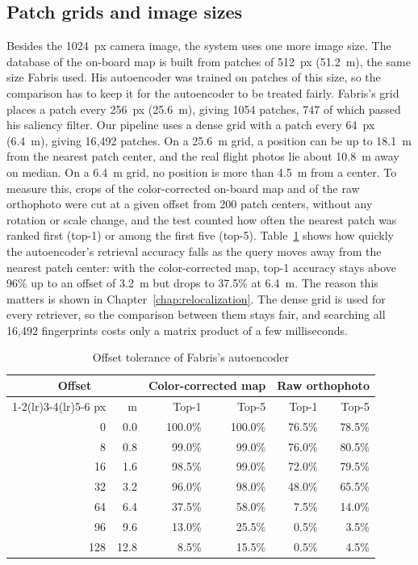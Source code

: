 \documentclass[english, Lau, oneside]{sapthesis}%
\begin{document}
\subsection{Patch grids and image sizes}
\label{sec:patch-grids}
Besides the 1024~px camera image, the system uses one more image size. The database of the on-board map is built from patches of 512~px (51.2~m), the same size Fabris used. His autoencoder was trained on patches of this size, so the comparison has to keep it for the autoencoder to be treated fairly. Fabris's grid places a patch every 256~px (25.6~m), giving 1054 patches, 747 of which passed his saliency filter. Our pipeline uses a dense grid with a patch every 64~px (6.4~m), giving 16{,}492 patches. On a 25.6~m grid, a position can be up to 18.1~m from the nearest patch center, and the real flight photos lie about 10.8~m away on median. On a 6.4~m grid, no position is more than 4.5~m from a center. To measure this, crops of the color-corrected on-board map and of the raw orthophoto were cut at a given offset from 200 patch centers, without any rotation or scale change, and the test counted how often the nearest patch was ranked first (top-1) or among the first five (top-5). Table~\ref{tab:offset-retrieval} shows how quickly the autoencoder's retrieval accuracy falls as the query moves away from the nearest patch center: with the color-corrected map, top-1 accuracy stays above 96\% up to an offset of 3.2~m but drops to 37.5\% at 6.4~m. The reason this matters is shown in Chapter~\ref{chap:relocalization}. The dense grid is used for every retriever, so the comparison between them stays fair, and searching all 16{,}492 fingerprints costs only a matrix product of a few milliseconds.

\begin{table}[!htbp]
  \centering
  \caption{Offset tolerance of Fabris's autoencoder}
  \label{tab:offset-retrieval}
  \begin{tabular}{rrrrrr}
    \toprule
    \multicolumn{2}{c}{Offset} & \multicolumn{2}{c}{Color-corrected map} & \multicolumn{2}{c}{Raw orthophoto} \\
    \cmidrule(lr){1-2}\cmidrule(lr){3-4}\cmidrule(lr){5-6}
    px & m & Top-1 & Top-5 & Top-1 & Top-5 \\
    \midrule
      0 &  0.0 & 100.0\% & 100.0\% & 76.5\% & 78.5\% \\
      8 &  0.8 &  99.0\% &  99.0\% & 76.0\% & 80.5\% \\
     16 &  1.6 &  98.5\% &  99.0\% & 72.0\% & 79.5\% \\
     32 &  3.2 &  96.0\% &  98.0\% & 48.0\% & 65.5\% \\
     64 &  6.4 &  37.5\% &  58.0\% &  7.5\% & 14.0\% \\
     96 &  9.6 &  13.0\% &  25.5\% &  0.5\% &  3.5\% \\
    128 & 12.8 &   8.5\% &  15.5\% &  0.5\% &  4.5\% \\
    \bottomrule
  \end{tabular}
\end{table}
\end{document}
